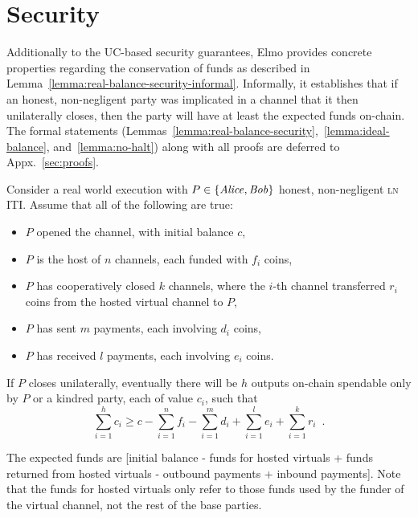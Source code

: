 \section{Security}
  \label{section:security}
  Additionally to the UC-based security guarantees, Elmo provides concrete
  properties regarding the conservation of funds as described in
  Lemma~\ref{lemma:real-balance-security-informal}. Informally, it establishes
  that if an honest, non-negligent party was implicated in a channel that it
  then unilaterally closes, then the party will have at least the expected funds
  on-chain. The formal statements
  (Lemmas~\ref{lemma:real-balance-security},~\ref{lemma:ideal-balance},
  and~\ref{lemma:no-halt}) along with all proofs are deferred to
  Appx.~\ref{sec:proofs}.

\begin{lemma}
\label{lemma:real-balance-security-informal}
  Consider a real world execution with $P \in \{\mathit{Alice}, \mathit{Bob}\}$ honest,
  non-negligent \textsc{ln} ITI. Assume that all of the following are true:
  \begin{itemize}
    \item $P$ opened the channel, with initial balance $c$,
    \item $P$ is the host of $n$ channels, each funded with $f_i$ coins,
    \item $P$ has cooperatively closed $k$ channels, where the $i$-th channel
    transferred $r_i$ coins from the hosted virtual channel to $P$,
    \item $P$ has sent $m$ payments, each involving $d_i$ coins,
    \item $P$ has received $l$ payments, each involving $e_i$ coins.
  \end{itemize}
  If $P$ closes unilaterally, eventually there will be $h$ outputs on-chain
  spendable only by $P$ or a kindred party, each of value $c_i$, such that
  \begin{equation}
    \sum\limits_{i=1}^h c_i \geq c - \sum\limits_{i=1}^n f_i -
    \sum\limits_{i=1}^m d_i + \sum\limits_{i=1}^l e_i + \sum\limits_{i=1}^k r_i
    \enspace.
  \end{equation}
\end{lemma}

  The expected funds are [initial balance - funds for hosted
  virtuals + funds returned from hosted virtuals - outbound payments + inbound
  payments]. Note that the funds for hosted virtuals only refer to those funds
  used by the funder of the virtual channel, not the rest of the base parties.

